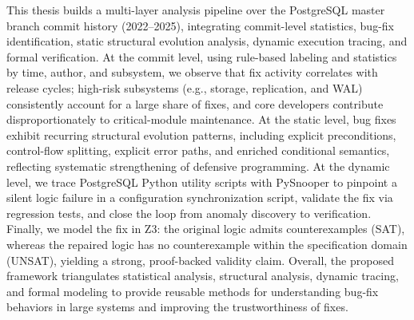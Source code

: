This thesis builds a multi-layer analysis pipeline over the PostgreSQL master branch commit history (2022--2025), integrating commit-level statistics, bug-fix identification, static structural evolution analysis, dynamic execution tracing, and formal verification. At the commit level, using rule-based labeling and statistics by time, author, and subsystem, we observe that fix activity correlates with release cycles; high-risk subsystems (e.g., storage, replication, and WAL) consistently account for a large share of fixes, and core developers contribute disproportionately to critical-module maintenance. At the static level, bug fixes exhibit recurring structural evolution patterns, including explicit preconditions, control-flow splitting, explicit error paths, and enriched conditional semantics, reflecting systematic strengthening of defensive programming. At the dynamic level, we trace PostgreSQL Python utility scripts with PySnooper to pinpoint a silent logic failure in a configuration synchronization script, validate the fix via regression tests, and close the loop from anomaly discovery to verification. Finally, we model the fix in Z3: the original logic admits counterexamples (SAT), whereas the repaired logic has no counterexample within the specification domain (UNSAT), yielding a strong, proof-backed validity claim. Overall, the proposed framework triangulates statistical analysis, structural analysis, dynamic tracing, and formal modeling to provide reusable methods for understanding bug-fix behaviors in large systems and improving the trustworthiness of fixes.


